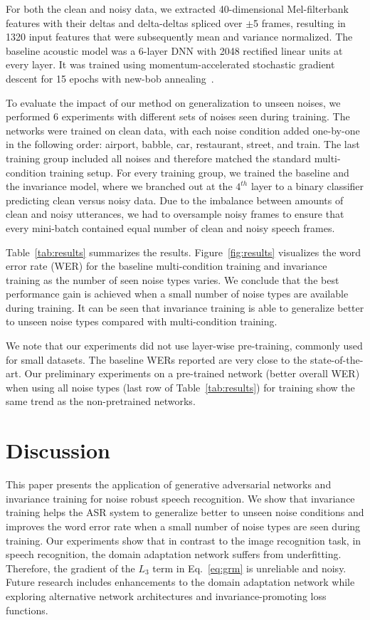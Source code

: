 \documentclass[a4paper]{article}
\begin{document}
For both the clean and noisy data, we extracted 40-dimensional Mel-filterbank features with their deltas and 
delta-deltas spliced over $\pm$5 frames, resulting in 1320 input 
features that were subsequently mean and variance normalized. The baseline
acoustic model was a 6-layer 
DNN with 2048 rectified linear units at every layer. It was trained using 
momentum-accelerated stochastic gradient descent for 15 epochs with new-bob 
annealing~\citep[as in][]{morgan1995continuous,sainath2011making}.

To evaluate the impact of our method on generalization to unseen noises,
we performed 6 experiments with different sets of noises seen during training.
The networks were trained
on clean data, with each noise condition added one-by-one in the following order: airport, babble, car, 
restaurant, street, and train. The last training group included all noises and therefore matched the
standard multi-condition training setup. For every training group, we trained the
baseline and the invariance model, where we branched out at the $4^{th}$ layer to a
binary classifier predicting clean versus noisy data. Due to the imbalance between amounts of clean and
noisy utterances, we had to oversample noisy frames to ensure that every mini-batch contained
equal number of clean and noisy speech frames.

Table~\ref{tab:results} summarizes the results. Figure~\ref{fig:results} visualizes 
the word error rate (WER) for the baseline multi-condition training and invariance training 
as the number of seen noise types varies. We conclude that the best performance
gain is achieved when a small number of noise types are available during training. 
It can be seen that invariance training is able to generalize better to unseen 
noise types compared with multi-condition training.

We note that our experiments did not use layer-wise pre-training, commonly used for small
datasets. The baseline WERs reported are very close to the state-of-the-art. 
Our preliminary experiments on a pre-trained network (better overall WER) when 
using all noise types (last row of Table~\ref{tab:results}) for training show 
the same trend as the non-pretrained networks.

\section{Discussion}
\label{sec:discussion}
    This paper presents the application of generative adversarial networks and 
    invariance training for noise robust speech recognition. We show that invariance training 
    helps the ASR system to generalize better to unseen noise conditions and improves 
    the word error rate when a small number of noise types are seen during training. Our 
    experiments show that in contrast to the image recognition task, in speech 
    recognition, the domain adaptation network suffers from underfitting. Therefore, the 
    gradient of the $L_3$ term in Eq.~\ref{eq:grm} is unreliable and noisy. Future 
    research includes enhancements to the domain adaptation network while exploring 
    alternative network architectures and invariance-promoting loss functions.
\end{document}
